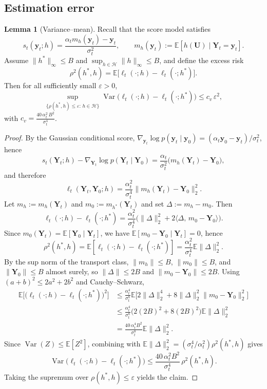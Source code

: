\documentclass[12pt]{article}
\theoremstyle{definition} %
\newtheorem{lemma}{Lemma}
\newcommand{\Var}{\operatorname{Var}}
\newcommand{\U}{\bm U}
\newcommand{\Y}{\bm Y}
\newcommand{\y}{\bm y}
\providecommand{\E}{\mathbb{E}}
\begin{document}
\subsection{Estimation error}\label{app:subsec-estimation-error}

\begin{lemma} [Variance--mean]\label{Variance}
Recall that the score model satisfies
\[
s_t(\y_t;h)=\frac{\alpha_t m_h(\y_t)-\y_t}{\sigma_t^2},\qquad
m_h(\y_t):=\E[h(\U)\mid \Y_t=\y_t].
\]
Assume $\|h^*\|_{\infty}\leq B$ and $\sup_{h\in\mathcal{H}}\|h\|_{\infty}\leq B$, and define the excess risk
\[
\rho^2(h^*,h)=\E\big[\ell_t(\cdot;h)-\ell_t(\cdot;h^*)\big].
\]
Then for all sufficiently small $\varepsilon>0$,
\[
\sup_{\{\rho(h^*,h)\le \varepsilon:\,h\in\mathcal H\}}
\Var\!\big(\ell_t(\cdot;h)-\ell_t(\cdot;h^*)\big)
\le c_v\,\varepsilon^2,
\]
with $
c_v=\frac{40\,\alpha_t^2\,B^2}{\sigma_t^4}$.
\end{lemma}

\begin{proof}
By the Gaussian conditional score,
$\nabla_{\y_t}\log p(\y_t\mid \y_0)=(\alpha_t \y_0-\y_t)/\sigma_t^2$,
hence
\[
s_t(\Y_t;h)-\nabla_{\Y_t}\log p(\Y_t\mid \Y_0)
=\frac{\alpha_t}{\sigma_t^2}\big(m_h(\Y_t)-\Y_0\big),
\]
and therefore
\[
\ell_t(\Y_t,\Y_0;h)=\frac{\alpha_t^2}{\sigma_t^4}\|m_h(\Y_t)-\Y_0\|_2^2.
\]
Let $m_h:=m_h(\Y_t)$ and $m_0:=m_{h^*}(\Y_t)$ and set $\Delta:=m_h-m_0$.
Then
\[
\ell_t(\cdot;h)-\ell_t(\cdot;h^*)
=\frac{\alpha_t^2}{\sigma_t^4}\Big(\|\Delta\|_2^2+2\langle \Delta,\,m_0-\Y_0\rangle\Big).
\]
Since $m_0(\Y_t)=\E[\Y_0\mid \Y_t]$, we have $\E[m_0-\Y_0\mid \Y_t]=0$, hence
\[
\rho^2(h^*,h)=\E[\ell_t(\cdot;h)-\ell_t(\cdot;h^*)]
=\frac{\alpha_t^2}{\sigma_t^4}\E\|\Delta\|_2^2.
\]
By the sup norm of the transport class, $\|m_h\|\le B$, $\|m_0\|\le B$,
and $\|\Y_0\|\le B$ almost surely, so $\|\Delta\|\le 2B$ and $\|m_0-\Y_0\|\le 2B$.
Using $(a+b)^2\le 2a^2+2b^2$ and Cauchy--Schwarz,
\begin{align*}
\E\Big[\big(\ell_t(\cdot;h)-\ell_t(\cdot;h^*)\big)^2\Big]
&\le \frac{\alpha_t^4}{\sigma_t^8}
\E\Big[2\|\Delta\|_2^4+8\|\Delta\|_2^2\|m_0-\Y_0\|_2^2\Big]\\
&\le \frac{\alpha_t^4}{\sigma_t^8}\Big(2(2B)^2+8(2B)^2\Big)\E\|\Delta\|_2^2\\
&= \frac{40\,\alpha_t^4B^2}{\sigma_t^8}\E\|\Delta\|_2^2.
\end{align*}
Since $\Var(Z)\le \E[Z^2]$, combining with $\E\|\Delta\|_2^2=(\sigma_t^4/\alpha_t^2)\rho^2(h^*,h)$ gives
\[
\Var\!\big(\ell_t(\cdot;h)-\ell_t(\cdot;h^*)\big)
\le \frac{40\,\alpha_t^2B^2}{\sigma_t^4}\,\rho^2(h^*,h).
\]
Taking the supremum over $\rho(h^*,h)\le\varepsilon$ yields the claim.
\end{proof}
\end{document}
